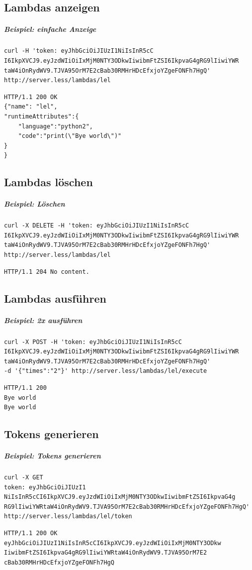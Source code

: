 \documentclass[a4paper,20pt,oneside]{book}
\begin{document}
\subsection{Lambdas anzeigen}
\subparagraph{Beispiel: einfache Anzeige}
\begin{lstlisting}
curl -H 'token: eyJhbGciOiJIUzI1NiIsInR5cC
I6IkpXVCJ9.eyJzdWIiOiIxMjM0NTY3ODkwIiwibmFtZSI6IkpvaG4gRG9lIiwiYWR
taW4iOnRydWV9.TJVA95OrM7E2cBab30RMHrHDcEfxjoYZgeFONFh7HgQ' http://server.less/lambdas/lel
\end{lstlisting}
\begin{lstlisting}
HTTP/1.1 200 OK
{"name": "lel",
"runtimeAttributes":{
	"language":"python2",
	"code":"print(\"Bye world\")"
}
}
\end{lstlisting}
\pagebreak
\subsection{Lambdas löschen}
\subparagraph{Beispiel: Löschen}
\begin{lstlisting}
curl -X DELETE -H 'token: eyJhbGciOiJIUzI1NiIsInR5cC
I6IkpXVCJ9.eyJzdWIiOiIxMjM0NTY3ODkwIiwibmFtZSI6IkpvaG4gRG9lIiwiYWR
taW4iOnRydWV9.TJVA95OrM7E2cBab30RMHrHDcEfxjoYZgeFONFh7HgQ'
http://server.less/lambdas/lel
\end{lstlisting}
\begin{lstlisting}
HTTP/1.1 204 No content.
\end{lstlisting}
\subsection{Lambdas ausführen}
\subparagraph{Beispiel: 2x ausführen}
\begin{lstlisting}
curl -X POST -H 'token: eyJhbGciOiJIUzI1NiIsInR5cC
I6IkpXVCJ9.eyJzdWIiOiIxMjM0NTY3ODkwIiwibmFtZSI6IkpvaG4gRG9lIiwiYWR
taW4iOnRydWV9.TJVA95OrM7E2cBab30RMHrHDcEfxjoYZgeFONFh7HgQ'
-d '{"times":"2"}' http://server.less/lambdas/lel/execute
\end{lstlisting}
\begin{lstlisting}
HTTP/1.1 200
Bye world
Bye world
\end{lstlisting}
\subsection{Tokens generieren}
\subparagraph{Beispiel: \glspl{Token} generieren}
\begin{lstlisting}
curl -X GET 
token: eyJhbGciOiJIUzI1
NiIsInR5cCI6IkpXVCJ9.eyJzdWIiOiIxMjM0NTY3ODkwIiwibmFtZSI6IkpvaG4g
RG9lIiwiYWRtaW4iOnRydWV9.TJVA95OrM7E2cBab30RMHrHDcEfxjoYZgeFONFh7HgQ'
http://server.less/lambdas/lel/token
\end{lstlisting}
\begin{lstlisting}
HTTP/1.1 200 OK eyJhbGciOiJIUzI1NiIsInR5cCI6IkpXVCJ9.eyJzdWIiOiIxMjM0NTY3ODkw
IiwibmFtZSI6IkpvaG4gRG9lIiwiYWRtaW4iOnRydWV9.TJVA95OrM7E2
cBab30RMHrHDcEfxjoYZgeFONFh7HgQ
\end{lstlisting}
\end{document}
